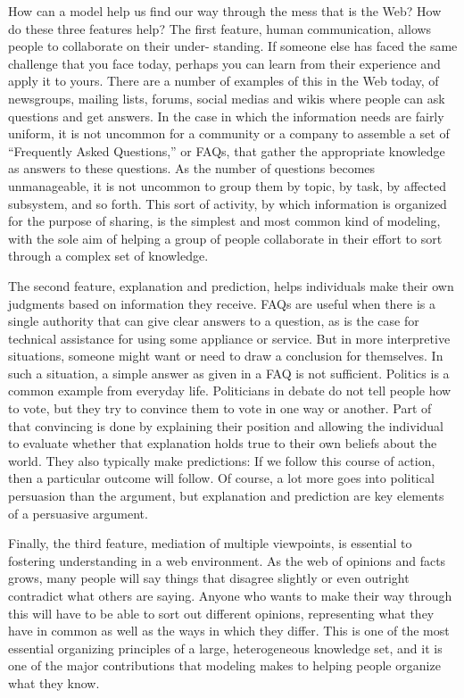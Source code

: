 How can a model help us find our way through the mess that is the Web?
How do these three features help? The first feature, human
communication, allows people to collaborate on their under- standing. If
someone else has faced the same challenge that you face today, perhaps
you can learn from their experience and apply it to yours. There are a
number of examples of this in the Web today, of newsgroups, mailing
lists, forums, social medias and wikis where people can ask questions
and get answers. In the case in which the information needs are fairly
uniform, it is not uncommon for a community or a company to assemble a
set of ``Frequently Asked Questions,'' or FAQs, that gather the
appropriate knowledge as answers to these questions. As the number of
questions becomes unmanageable, it is not uncommon to group them by
topic, by task, by affected subsystem, and so forth. This sort of
activity, by which information is organized for the purpose of sharing,
is the simplest and most common kind of modeling, with the sole aim of
helping a group of people collaborate in their effort to sort through a
complex set of knowledge.

The second feature, explanation and prediction, helps individuals make
their own judgments based on information they receive. FAQs are useful
when there is a single authority that can give clear answers to a
question, as is the case for technical assistance for using some
appliance or service. But in more interpretive situations, someone might
want or need to draw a conclusion for themselves. In such a situation, a
simple answer as given in a FAQ is not sufficient. Politics is a common
example from everyday life. Politicians in debate do not tell people how
to vote, but they try to convince them to vote in one way or another.
Part of that convincing is done by explaining their position and
allowing the individual to evaluate whether that explanation holds true
to their own beliefs about the world. They also typically make
predictions: If we follow this course of action, then a particular
outcome will follow. Of course, a lot more goes into political
persuasion than the argument, but explanation and prediction are key
elements of a persuasive argument.

Finally, the third feature, mediation of multiple viewpoints, is
essential to fostering understanding in a web environment. As the web of
opinions and facts grows, many people will say things that disagree
slightly or even outright contradict what others are saying. Anyone who
wants to make their way through this will have to be able to sort out
different opinions, representing what they have in common as well as the
ways in which they differ. This is one of the most essential organizing
principles of a large, heterogeneous knowledge set, and it is one of the
major contributions that modeling makes to helping people organize what
they know.

